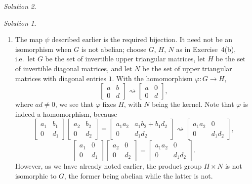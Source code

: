 \documentclass[11pt]{report}
\theoremstyle{remark}
\newtheorem*{solution}{Solution}
\begin{document}
\begin{solution}
\begin{solution}
\begin{enumerate}
        \item The map $\psi$ described earlier is the required bijection. It need
        not be an isomorphism when $G$ is not abelian; choose $G$, $H$, $N$ as in
        Exercise~4(b), i.e.\ let $G$ be the set of invertible upper triangular
        matrices, let $H$ be the set of invertible diagonal matrices, and let $N$ be
        the set of upper triangular matrices with diagonal entries $1$. With the
        homomorphism $\varphi\colon G \to H$, \[
            \begin{bmatrix}
                a & b \\ 0 & d
            \end{bmatrix} \rightsquigarrow \begin{bmatrix}
                a & 0 \\ 0 & d
            \end{bmatrix},
        \] where $ad \neq 0$, we see that $\varphi$ fixes $H$, with $N$ being the
        kernel. Note that $\varphi$ is indeed a homomorphism, because \[
            \begin{bmatrix}
                a_1 & b_1 \\ 0 & d_1
            \end{bmatrix} \begin{bmatrix}
                a_2 & b_2 \\ 0 & d_2
            \end{bmatrix} = \begin{bmatrix}
                a_1a_2 & a_1b_2 + b_1d_2 \\ 0 & d_1d_2
            \end{bmatrix} \rightsquigarrow \begin{bmatrix}
                a_1a_2 & 0 \\ 0 & d_1d_2
            \end{bmatrix},
        \] \[
            \begin{bmatrix}
                a_1 & 0 \\ 0 & d_1
            \end{bmatrix} \begin{bmatrix}
                a_2 & 0 \\ 0 & d_2
            \end{bmatrix} = \begin{bmatrix}
                a_1a_2 & 0 \\ 0 & d_1d_2
            \end{bmatrix}.
        \] However, as we have already noted earlier, the product group $H \times N$
        is not isomorphic to $G$, the former being abelian while the latter is not.
    \end{enumerate}
    \end{solution}  



\end{solution}
\end{document}
